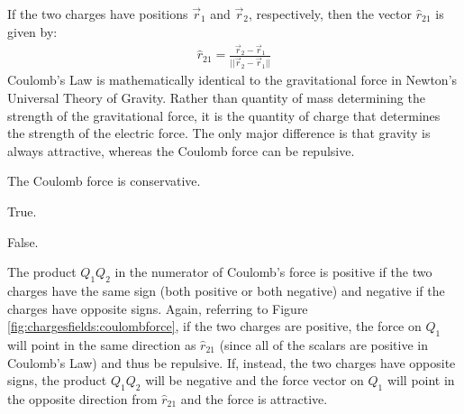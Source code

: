 If the two charges have positions $\vec r_1$ and $\vec r_2$, respectively, then the vector $\hat r_{21}$ is given by:
\begin{align*}
\hat r_{21} = \frac{\vec r_2 - \vec r_1}{||\vec r_2 - \vec r_1||}
\end{align*}
Coulomb's Law is mathematically identical to the gravitational force in Newton's Universal Theory of Gravity. Rather than quantity of mass determining the strength of the gravitational force, it is the quantity of charge that determines the strength of the electric force. The only major difference is that gravity is always attractive, whereas the Coulomb force can be repulsive.
\begin{checkpoint}\label{cp:chargesfields:conservative}
\begin{MCquestion}{The Coulomb force is conservative.}
\item True. \correct
\item False.
\end{MCquestion}
\end{checkpoint}
The product $Q_1Q_2$ in the numerator of Coulomb's force is positive if the two charges have the same sign (both positive or both negative) and negative if the charges have opposite signs. Again, referring to Figure \ref{fig:chargesfields:coulombforce}, if the two charges are positive, the force on $Q_1$ will point in the same direction as $\hat r_{21}$ (since all of the scalars are positive in Coulomb's Law) and thus be repulsive. If, instead, the two charges have opposite signs, the product $Q_1Q_2$ will be negative and the force vector on $Q_1$ will point in the opposite direction from $\hat r_{21}$ and the force is attractive. 
